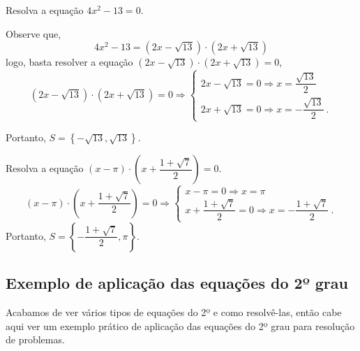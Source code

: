  \begin{exem}
 Resolva a equação $4x^2 - 13= 0$.

Observe que,
\begin{equation}
4x^2 - 13= (2x - \sqrt{13}) \cdot (2x + \sqrt{13})
\end{equation}
logo, basta resolver a equação $(2x - \sqrt{13}) \cdot (2x + \sqrt{13})= 0$,
\[(2x - \sqrt{13}) \cdot (2x + \sqrt{13})=0 \Rightarrow
\begin{cases}
 2x - \sqrt{13}=0 \Rightarrow x= \dfrac{\sqrt{13}}{2} \\
 2x + \sqrt{13}= 0 \Rightarrow x= - \dfrac{\sqrt{13}}{2} \ .
\end{cases}\]

Portanto, $S= \left\{ -\sqrt{13}, \sqrt{13}  \right\}$.
 \end{exem}

 \begin{exem}
 Resolva a equação $(x - \pi) \cdot \left(x + \dfrac{1 + \sqrt{7}}{2}\right)= 0$.
\[(x - \pi) \cdot \left(x + \dfrac{1 + \sqrt{7}}{2} \right)= 0 \Rightarrow
\begin{cases}
 x - \pi=0 \Rightarrow x= \pi \\
 x + \dfrac{1 + \sqrt{7}}{2} = 0 \Rightarrow x= - \dfrac{1 + \sqrt{7}}{2} \ .
\end{cases} \]
Portanto, $S= \left\{ - \dfrac{1 + \sqrt{7}}{2}, \pi \right\}$.
\end{exem}


\vskip0.3cm
\subsection{Exemplo de aplicação das equações do 2º grau}

Acabamos de ver vários tipos de equações do 2º e como resolvê-las, então cabe aqui ver um exemplo prático de aplicação das equações do 2º grau para resolução de problemas.

